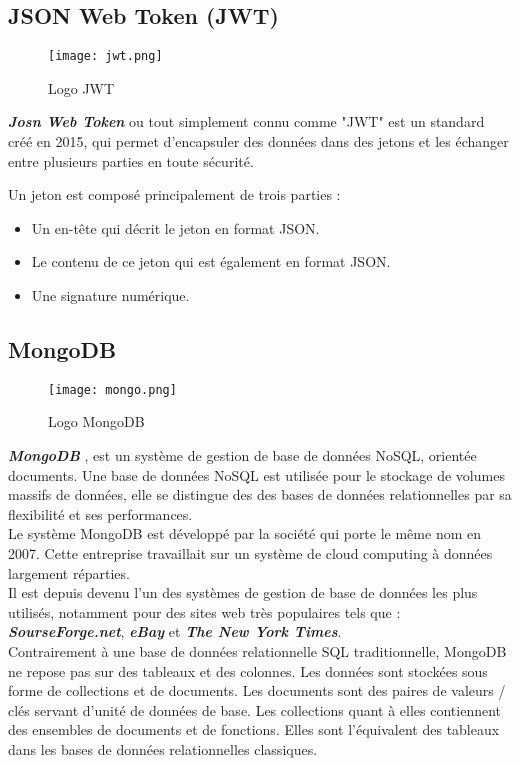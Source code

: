\subsection{JSON Web Token (JWT)}
\begin{figure}[H]
    \centering
    \texttt{[image: jwt.png]}
    \vspace{1cm}
    \captionsetup{justification=centering}
    \caption{Logo JWT}
    \label{fig:jwt_logo}
\end{figure}
\textbf{\textit{Josn Web Token}} ou tout simplement connu comme "JWT" est un standard créé en 2015, qui permet d'encapsuler des données dans des jetons et les échanger entre plusieurs parties en toute sécurité.

Un jeton est composé principalement de trois parties :
\begin{itemize}
    \item Un en-tête qui décrit le jeton en format JSON.
    \item Le contenu de ce jeton qui est également en format JSON.
    \item Une signature numérique.
\end{itemize}
\subsection{MongoDB}
\vspace{1cm}
\begin{figure}[H]
    \centering
    \texttt{[image: mongo.png]}
    \vspace{1cm}
    \captionsetup{justification=centering}

    \caption{Logo MongoDB}
    \label{fig:mongo_logo}
\end{figure}
\textit{\textbf{MongoDB}} \cite{mongodb} , est un système de gestion de base de données NoSQL, orientée documents. Une base de données NoSQL est utilisée pour le stockage de volumes massifs de données, elle se distingue des des bases de données relationnelles par sa flexibilité et ses performances.\\
\noindent Le système MongoDB est développé par la société qui porte le même nom en 2007. Cette entreprise travaillait sur un système de cloud computing à données largement réparties.\\
\noindent Il est depuis devenu l'un des systèmes de gestion de base de données les plus utilisés, notamment pour des sites web très populaires tels que : \textit{\textbf{SourseForge.net}}, \textit{\textbf{eBay}} et \textit{\textbf{The New York Times}}.\\
\noindent Contrairement à une base de données relationnelle SQL traditionnelle, MongoDB ne repose pas sur des tableaux et des colonnes. Les données sont stockées sous forme de collections et de documents.
Les documents sont des paires de valeurs / clés servant d'unité de données de base. Les collections quant à elles contiennent des ensembles de documents et de fonctions. Elles sont l'équivalent des tableaux dans les bases de données relationnelles classiques.

